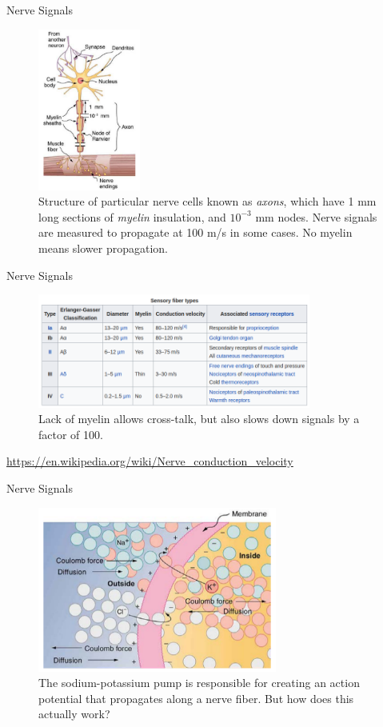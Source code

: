 \documentclass{beamer}
\begin{document}
\begin{frame}{Nerve Signals}
\begin{figure}
\centering
\includegraphics[width=0.3\textwidth]{figures/nerve1.png}
\caption{\label{fig:nerve1}  Structure of particular nerve cells known as \textit{axons}, which have 1 mm long sections of \textit{myelin} insulation, and $10^{-3}$ mm nodes.  Nerve signals are measured to propagate at 100 m/s in some cases.  No myelin means slower propagation.}
\end{figure}
\end{frame}

\begin{frame}{Nerve Signals}
\begin{figure}
\centering
\includegraphics[width=0.8\textwidth]{figures/SensoryWiki.png}
\caption{\label{fig:sense} Lack of myelin allows cross-talk, but also slows down signals by a factor of 100.}
\end{figure}
\url{https://en.wikipedia.org/wiki/Nerve_conduction_velocity}
\end{frame}

\begin{frame}{Nerve Signals}
\begin{figure}
\centering
\includegraphics[width=0.7\textwidth]{figures/nerve2.png}
\caption{\label{fig:nerve2} The sodium-potassium pump is responsible for creating an action potential that propagates along a nerve fiber.  But how does this actually work?}
\end{figure}
\end{frame}
\end{document}
